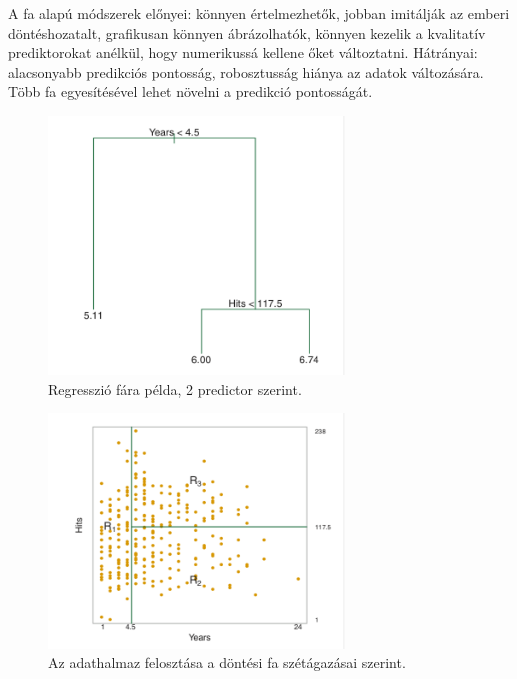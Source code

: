 \documentclass[12pt]{article}
\theoremstyle{plain}
\begin{document}
A fa alapú módszerek előnyei: könnyen értelmezhetők, jobban imitálják az emberi döntéshozatalt, grafikusan könnyen ábrázolhatók, könnyen kezelik a kvalitatív prediktorokat anélkül, hogy numerikussá kellene őket változtatni. Hátrányai: alacsonyabb predikciós pontosság, robosztusság hiánya az adatok változására. Több fa egyesítésével lehet növelni a predikció pontosságát. 


\begin{figure}
    \begin{center}
    \includegraphics[width=0.7\textwidth]{media/tree1.png}
    \caption{Regresszió fára példa, 2 predictor szerint.} 
    \label{tree1}
    \end{center}
\end{figure}

\begin{figure}
    \begin{center}
    \includegraphics[width=0.7\textwidth]{media/tree2.png}
    \caption{Az adathalmaz felosztása a döntési fa szétágazásai szerint. } 
    \label{tree2}
    \end{center}
\end{figure}
\end{document}
